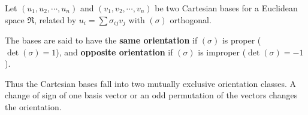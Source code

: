 Let $(u_1, u_2, \cdots, u_n)$ and $(v_1, v_2, \cdots, v_n)$ be two Cartesian bases for a Euclidean space $\Re$, related by $u_i = \sum \sigma_{ij} v_j$ with $(\sigma)$ orthogonal.

The bases are said to have the \textbf{same orientation} if $(\sigma)$ is proper ($\det(\sigma) = 1$), and \textbf{opposite orientation} if $(\sigma)$ is improper ($\det(\sigma) = -1$).

Thus the Cartesian bases fall into two mutually exclusive orientation classes. A change of sign of one basis vector or an odd permutation of the vectors changes the orientation.
